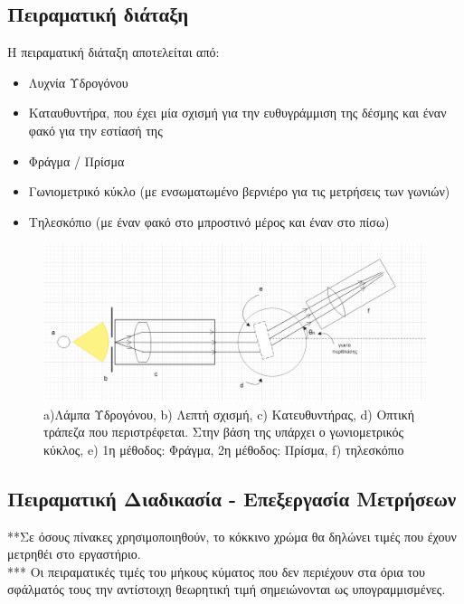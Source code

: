 \documentclass[a4paper]{article}
\begin{document}
\subsection*{Πειραματική διάταξη}
Η πειραματική διάταξη αποτελείται από: 
\begin{itemize}
	\item Λυχνία Υδρογόνου
	\item Καταυθυντήρα, που έχει μία σχισμή για την ευθυγράμμιση της δέσμης και έναν φακό για την εστίασή της 
	\item Φράγμα / Πρίσμα 
	\item Γωνιομετρικό κύκλο (με ενσωματωμένο βερνιέρο για τις μετρήσεις των γωνιών) 
	\item Τηλεσκόπιο (με έναν φακό στο μπροστινό μέρος και έναν στο πίσω)
\end{itemize}

\begin{figure}[h!]
	\centering
	\includegraphics[scale=0.45]{setup.png}
	\caption{ a)Λάμπα Υδρογόνου, b) Λεπτή σχισμή, c) Κατευθυντήρας, d) Οπτική τράπεζα που περιστρέφεται. Στην βάση της υπάρχει ο γωνιομετρικός κύκλος, e) 1η μέθοδος: Φράγμα, 2η μέθοδος: Πρίσμα, f) τηλεσκόπιο}
\end{figure}

\subsection*{Πειραματική Διαδικασία - Επεξεργασία Μετρήσεων}
 
 **Σε όσους πίνακες χρησιμοποιηθούν, το κόκκινο χρώμα θα δηλώνει τιμές που έχουν μετρηθέι στο εργαστήριο.\\
 *** Οι πειραματικές τιμές του μήκους κύματος που δεν περιέχουν στα όρια του σφάλματός τους την αντίστοιχη θεωρητική τιμή σημειώνονται ως υπογραμμισμένες. \\ 
\end{document}
